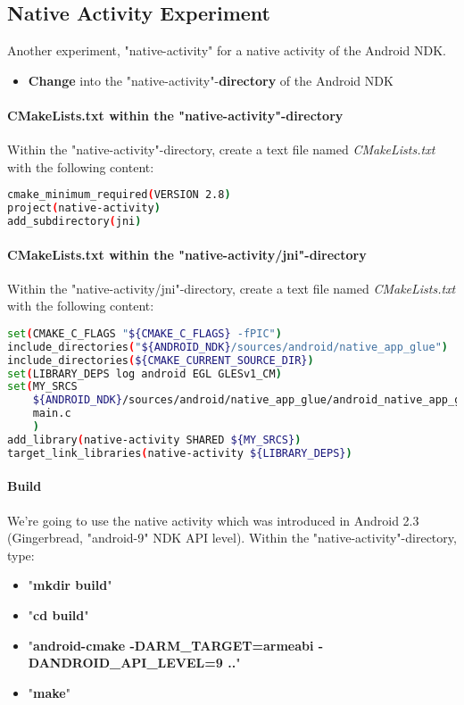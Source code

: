 \subsection{Native Activity Experiment}
Another experiment, "native-activity" for a native activity of the Android NDK.

\begin{itemize}
\item{\textbf{Change} into the "native-activity"-\textbf{directory}} of the Android NDK
\end{itemize}


\paragraph{CMakeLists.txt within the "native-activity"-directory}
Within the "native-activity"-directory, create a text file named \emph{CMakeLists.txt} with the following content:
\begin{lstlisting}[language=bash]
cmake_minimum_required(VERSION 2.8)
project(native-activity)
add_subdirectory(jni)
\end{lstlisting}


\paragraph{CMakeLists.txt within the "native-activity/jni"-directory}
Within the "native-activity/jni"-directory, create a text file named \emph{CMakeLists.txt} with the following content:
\begin{lstlisting}[language=bash]
set(CMAKE_C_FLAGS "${CMAKE_C_FLAGS} -fPIC")
include_directories("${ANDROID_NDK}/sources/android/native_app_glue")
include_directories(${CMAKE_CURRENT_SOURCE_DIR})
set(LIBRARY_DEPS log android EGL GLESv1_CM)
set(MY_SRCS
    ${ANDROID_NDK}/sources/android/native_app_glue/android_native_app_glue.c
    main.c
    )
add_library(native-activity SHARED ${MY_SRCS})
target_link_libraries(native-activity ${LIBRARY_DEPS})
\end{lstlisting}


\paragraph{Build}
We're going to use the native activity which was introduced in Android 2.3 (Gingerbread, "android-9" NDK API level). Within the "native-activity"-directory, type:
\begin{itemize}
\item{"\textbf{mkdir build}"}
\item{"\textbf{cd build}"}
\item{"\textbf{android-cmake -DARM\_TARGET=armeabi -DANDROID\_API\_LEVEL=9 ..}"}
\item{"\textbf{make}"}
\end{itemize}



